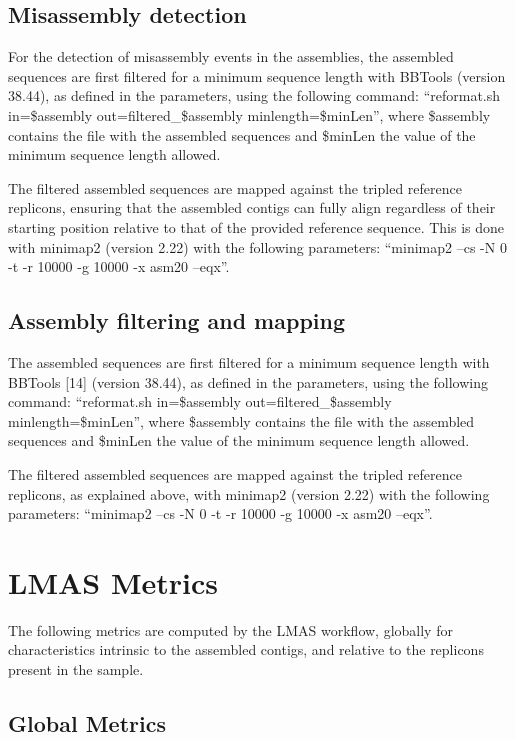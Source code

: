 \subsection{Misassembly detection} \label{chap5_sup_misassembly}

For the detection of misassembly events in the assemblies, the assembled sequences are first filtered for a minimum sequence length with BBTools \cite{bushnell_bbmerge_2017} (version 38.44), as defined in the parameters, using the following command: “reformat.sh in=\$assembly out=filtered\_\$assembly minlength=\$minLen”, where \$assembly contains the file with the assembled sequences and \$minLen the value of the minimum sequence length allowed. 

The filtered assembled sequences are mapped against the tripled reference replicons, ensuring that the assembled contigs can fully align regardless of their starting position relative to that of the provided reference sequence. This is done with minimap2 \cite{li_minimap2_2018} (version 2.22) with the following parameters: “minimap2 --cs -N 0 -t -r 10000 -g 10000 -x asm20 --eqx”.

\subsection{Assembly filtering and mapping}

The assembled sequences are first filtered for a minimum sequence length with BBTools [14] (version 38.44), as defined in the parameters, using the following command: “reformat.sh in=\$assembly out=filtered\_\$assembly minlength=\$minLen”, where \$assembly contains the file with the assembled sequences and \$minLen the value of the minimum sequence length allowed. 

The filtered assembled sequences are mapped against the tripled reference replicons, as explained above, with minimap2 \cite{li_minimap2_2018} (version 2.22) with the following parameters: “minimap2 --cs -N 0 -t -r 10000 -g 10000 -x asm20 --eqx”.

\section{LMAS Metrics}

The following metrics are computed by the LMAS workflow, globally for characteristics intrinsic to the assembled contigs, and relative to the replicons present in the sample. 

\subsection{Global Metrics}

